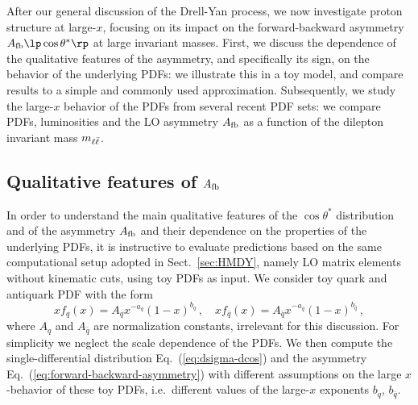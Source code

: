 
After our general discussion of the Drell-Yan process,
we now investigate
 proton structure at large-$x$, focusing on its
impact on the forward-backward asymmetry $A_{\rm fb}\lp \cos\theta^*\rp$
at large invariant masses.
%
First, we discuss the dependence of the
qualitative features of the asymmetry,
and specifically its sign, on the behavior of the underlying PDFs: we
illustrate this in a toy model, and compare results to a simple and 
commonly used approximation.
%
Subsequently,
we study the large-$x$ behavior of the PDFs from several
recent PDF sets: we compare PDFs, luminosities and the LO asymmetry
$A_{\rm fb}$ as a function of the dilepton invariant mass $m_{\ell\bar{\ell}}$.

\subsection{Qualitative features of \texorpdfstring{$A_{\rm fb}$}{Afb}}
\label{sec:afb_toy}

In order to understand the main qualitative features of  the $\cos\theta^*$
distribution and of the asymmetry $A_{\rm fb}$ and their dependence on the 
properties of the underlying
PDFs, it is instructive to evaluate predictions based on the
same computational setup adopted in Sect.~\ref{sec:HMDY}, namely
 LO matrix elements without kinematic cuts, using toy PDFs as input.
%
We consider toy quark and antiquark PDF with  the form
\begin{equation}
  \label{eq:toypdf}
  xf_q(x) = A_qx^{-a_q}(1-x)^{b_q} \, , \quad xf_{\bar{q}}(x) = A_{\bar{q}}x^{-a_{\bar{q}}}(1-x)^{b_{\bar{q}}} \, ,
\end{equation}
where $A_q$ and $A_{\bar{q}}$ are  normalization constants, irrelevant
for this discussion.
%
For simplicity we neglect the scale dependence of
the PDFs.
%
We then compute the single-differential distribution Eq.~(\ref{eq:dsigma-dcos}) and
the asymmetry Eq.~(\ref{eq:forward-backward-asymmetry}) with different assumptions on the
large $x$-behavior of these toy PDFs, i.e.\ different values of the large-$x$
exponents $b_q$, $b_{\bar{q}}$.


